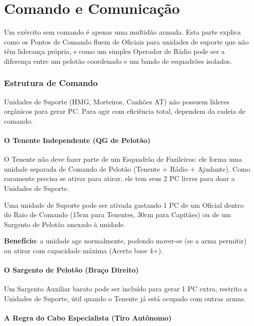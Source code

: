 \part{Comando e Comunicação}

Um exército sem comando é apenas uma multidão armada. Esta parte explica como os Pontos de Comando fluem de Oficiais para unidades de suporte que não têm liderança própria, e como um simples Operador de Rádio pode ser a diferença entre um pelotão coordenado e um bando de esquadrões isolados.

\section{Estrutura de Comando}

Unidades de Suporte (HMG, Morteiros, Canhões AT) não possuem líderes orgânicos para gerar PC. Para agir com eficiência total, dependem da cadeia de comando.

\subsection{O Tenente Independente (QG de Pelotão)}

O Tenente não deve fazer parte de um Esquadrão de Fuzileiros: ele forma uma unidade separada de Comando de Pelotão (Tenente + Rádio + Ajudante). Como raramente precisa se ativar para atirar, ele tem seus 2 PC livres para doar a Unidades de Suporte.

Uma unidade de Suporte pode ser ativada gastando 1 PC de um Oficial dentro do Raio de Comando (15cm para Tenentes, 30cm para Capitães) ou de um Sargento de Pelotão anexado à unidade.

\textbf{Benefício}: a unidade age normalmente, podendo mover-se (se a arma permitir) ou atirar com capacidade máxima (Acerto base 4+).

\subsection{O Sargento de Pelotão (Braço Direito)}
\label{sec:sargento-pelotao}

Um Sargento Auxiliar barato pode ser incluído para gerar 1 PC extra, restrito a Unidades de Suporte, útil quando o Tenente já está ocupado com outras armas.

\subsection{A Regra do Cabo Especialista (Tiro Autônomo)}
\label{sec:cabo-especialista}

